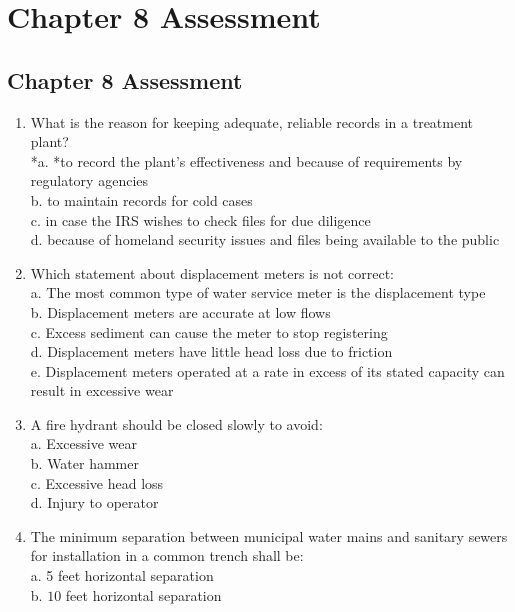 
\chapter*{Chapter 8 Assessment}

\section*{Chapter 8 Assessment}
\begin{enumerate}[1.]
\item What is the reason for keeping adequate, reliable records in a treatment plant?\\
*a. *to record the plant's effectiveness and because of requirements by regulatory agencies\\
b. to maintain records for cold cases\\
c. in case the IRS wishes to check files for due diligence\\
d. because of homeland security issues and files being available to the public\\
\item Which statement about displacement meters is not correct:\\
a. The most common type of water service meter is the displacement type\\
b. Displacement meters are accurate at low flows\\
c. Excess sediment can cause the meter to stop registering\\
d. Displacement meters have little head loss due to friction\\
e. Displacement meters operated at a rate in excess of its stated capacity can result in excessive wear\\
\item A fire hydrant should be closed slowly to avoid:\\
a. Excessive wear\\
b. Water hammer\\
c. Excessive head loss\\
d. Injury to operator\\
\item The minimum separation between municipal water mains and sanitary sewers for installation in a common trench shall be:\\
a. 5 feet horizontal separation\\
b. $ 10$ feet horizontal separation\\

\end{enumerate}
